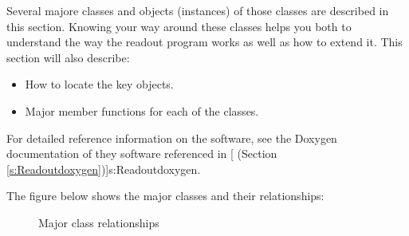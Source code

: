       Several majore classes and objects (instances) of those classes are
      described in this section.  Knowing your way around these classes
      helps you both to understand the way the readout program works
      as well as how to extend it.  This section will also describe:

      \begin{itemize}
	 \item How to locate the key objects.
	 \item Major member functions for each of the classes.
       \end{itemize}
       
       For detailed reference information on the software, see
       the Doxygen documentation of they software referenced
       in [
	  (Section \ref{s:Readoutdoxygen})]{s:Readoutdoxygen}.
	  
      The figure below shows the major classes and their relationships:

      \begin{figure}[htb]
	 \caption{Major class relationships}

	 \end{figure}   
      
